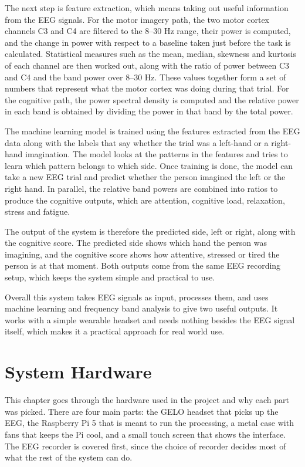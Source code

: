 The next step is feature extraction, which means taking out useful information from the
EEG signals. For the motor imagery path, the two motor cortex channels C3 and C4 are
filtered to the 8--30 Hz range, their power is computed, and the change in power with
respect to a baseline taken just before the task is calculated. Statistical measures such
as the mean, median, skewness and kurtosis of each channel are then worked out, along with
the ratio of power between C3 and C4 and the band power over 8--30 Hz. These values
together form a set of numbers that represent what the motor cortex was doing during that
trial. For the cognitive path, the power spectral density is computed and the relative
power in each band is obtained by dividing the power in that band by the total power.

The machine learning model is trained using the features extracted from the EEG data along
with the labels that say whether the trial was a left-hand or a right-hand imagination. The
model looks at the patterns in the features and tries to learn which pattern belongs to
which side. Once training is done, the model can take a new EEG trial and predict whether
the person imagined the left or the right hand. In parallel, the relative band powers are
combined into ratios to produce the cognitive outputs, which are attention, cognitive load,
relaxation, stress and fatigue.

The output of the system is therefore the predicted side, left or right, along with the
cognitive score. The predicted side shows which hand the person was imagining, and the
cognitive score shows how attentive, stressed or tired the person is at that moment. Both
outputs come from the same EEG recording setup, which keeps the system simple and practical
to use.

Overall this system takes EEG signals as input, processes them, and uses machine learning
and frequency band analysis to give two useful outputs. It works with a simple wearable
headset and needs nothing besides the EEG signal itself, which makes it a practical
approach for real world use.


\chapter{System Hardware}
This chapter goes through the hardware used in the project and why each part was picked.
There are four main parts: the GELO headset that picks up the EEG, the Raspberry Pi 5 that
is meant to run the processing, a metal case with fans that keeps the Pi cool, and a small
touch screen that shows the interface. The EEG recorder is covered first, since the choice
of recorder decides most of what the rest of the system can do.

